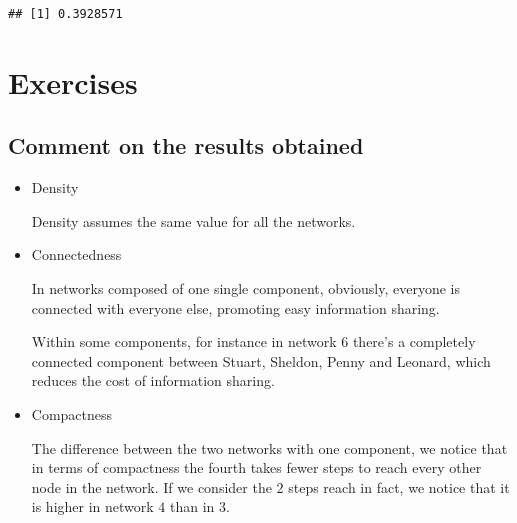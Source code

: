 \documentclass[
  notitlepage,
  onecolumn,
  openany]{book}
\newenvironment{Shaded}{\begin{snugshade}}{\end{snugshade}}
\newcommand{\CommentTok}[1]{\textcolor[rgb]{0.56,0.35,0.01}{\textit{#1}}}
\newcommand{\DecValTok}[1]{\textcolor[rgb]{0.00,0.00,0.81}{#1}}
\newcommand{\FunctionTok}[1]{\textcolor[rgb]{0.00,0.00,0.00}{#1}}
\newcommand{\NormalTok}[1]{#1}
\newcommand{\OtherTok}[1]{\textcolor[rgb]{0.56,0.35,0.01}{#1}}
\newcommand{\SpecialCharTok}[1]{\textcolor[rgb]{0.00,0.00,0.00}{#1}}
\begin{document}
\begin{Shaded}
\end{Shaded}

\begin{verbatim}
## [1] 0.3928571
\end{verbatim}

\hypertarget{exercises}{%
\section{Exercises}\label{exercises}}

\hypertarget{comment-on-the-results-obtained}{%
\subsection{Comment on the results obtained}\label{comment-on-the-results-obtained}}

\begin{itemize}
\item
  Density

  Density assumes the same value for all the networks.
\item
  Connectedness

  In networks composed of one single component, obviously, everyone is connected with everyone else, promoting easy information sharing.

  Within some components, for instance in network \(6\) there's a completely connected component between Stuart, Sheldon, Penny and Leonard, which reduces the cost of information sharing.
\item
  Compactness

  The difference between the two networks with one component, we notice that in terms of compactness the fourth takes fewer steps to reach every other node in the network. If we consider the \(2\) steps reach in fact, we notice that it is higher in network \(4\) than in \(3\).
\end{itemize}
\end{document}
